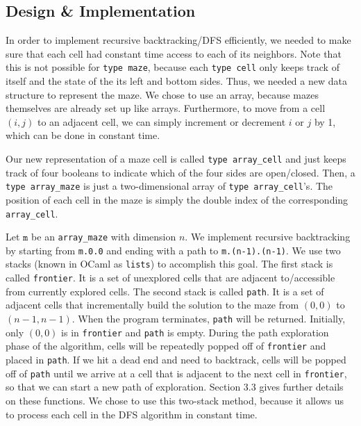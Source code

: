 \documentclass[11pt, margin=1in]{article}
\newcommand{\tab}{\par \qquad}
\begin{document}
\subsection{Design \& Implementation}
In order to implement recursive backtracking/DFS efficiently, we needed to make sure that each cell had constant time access to each of its neighbors.  Note that this is not possible for \texttt{type maze}, because each \texttt{type cell} only keeps track of itself and the state of the its left and bottom sides.  Thus, we needed a new data structure to represent the maze.  We chose to use an array, because mazes themselves are already set up like arrays.  Furthermore, to move from a cell $(i, j)$ to an adjacent cell, we can simply increment or decrement $i$ or $j$ by 1, which can be done in constant time.   
\tab Our new representation of a maze cell is called \texttt{type array\_cell} and just keeps track of four booleans to indicate which of the four sides are open/closed.  Then, a \texttt{type array\_maze} is just a two-dimensional array of \texttt{type array\_cell}'s.  The position of each cell in the maze is simply the double index of the corresponding \texttt{array\_cell}.  
\tab Let $\texttt{m}$ be an \texttt{array\_maze} with dimension $n$.    We implement recursive backtracking by starting from \texttt{m.0.0} and ending with a path to \texttt{m.(n-1).(n-1)}.  We use two stacks (known in OCaml as \texttt{lists}) to accomplish this goal.  The first stack is called \texttt{frontier}.  It is a set of unexplored cells that are adjacent to/accessible from currently explored cells.  The second stack is called \texttt{path}.  It is a set of adjacent cells that incrementally build the solution to the maze from $(0, 0)$ to $(n-1, n-1)$.  When the program terminates, \texttt{path} will be returned.  Initially, only $(0, 0)$ is in \texttt{frontier} and \texttt{path} is empty.  During the path exploration phase of the algorithm, cells will be repeatedly popped off of \texttt{frontier} and placed in \texttt{path}.  If we hit a dead end and need to backtrack, cells will be popped off of \texttt{path} until we arrive at a cell that is adjacent to the next cell in \texttt{frontier}, so that we can start a new path of exploration.  Section 3.3 gives further details on these functions.  We chose to use this two-stack method, because it allows us to process each cell in the DFS algorithm in constant time.                          
\end{document}
